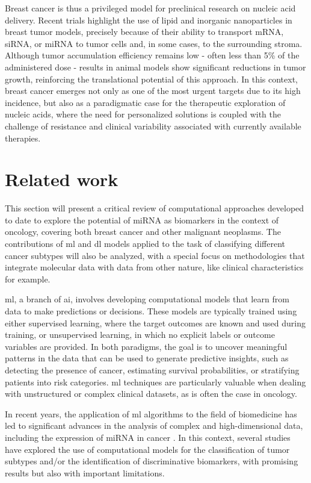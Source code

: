 Breast cancer is thus a privileged model for preclinical research on nucleic
acid delivery. Recent trials highlight the use of lipid and inorganic
nanoparticles in breast tumor models, precisely because of their ability to
transport mRNA, siRNA, or miRNA to tumor cells and, in some cases, to the
surrounding stroma. Although tumor accumulation efficiency remains low - often
less than 5\% of the administered dose - results in animal models show
significant reductions in tumor growth, reinforcing the translational potential
of this approach. In this context, breast cancer emerges not only as one of the
most urgent targets due to its high incidence, but also as a paradigmatic case
for the therapeutic exploration of nucleic acids, where the need for
personalized solutions is coupled with the challenge of resistance and clinical
variability associated with currently available therapies.

\section{Related work}

This section will present a critical review of computational approaches
developed to date to explore the potential of miRNA as biomarkers in the
context of oncology, covering both breast cancer and other malignant neoplasms. The
contributions of \gls{ml} and \gls{dl} models applied to the task of
classifying different cancer subtypes will also be analyzed, with a special
focus on methodologies that integrate molecular data with data from other
nature, like clinical characteristics for example.

\gls{ml}, a branch of \gls{ai}, involves
developing computational models that learn from data to make predictions or
decisions. These models are typically trained using either supervised
learning, where the target outcomes are known and used during training, or
unsupervised learning, in which no explicit labels or outcome variables are
provided. In both paradigms, the goal is to uncover meaningful patterns in the
data that can be used to generate predictive insights, such as detecting the
presence of cancer, estimating survival probabilities, or stratifying patients
into risk categories. \gls{ml} techniques are particularly valuable when dealing with
unstructured or complex clinical datasets, as is often the case in oncology.

In recent years, the application of \gls{ml} algorithms to the field of
biomedicine has led to significant advances in the analysis of complex and
high-dimensional data, including the expression of miRNA in cancer
\cite{role_of_ai_giger2021}. In this context, several studies have explored the
use of computational models for the classification of tumor subtypes and/or the
identification of discriminative biomarkers, with promising results but also
with important limitations.

